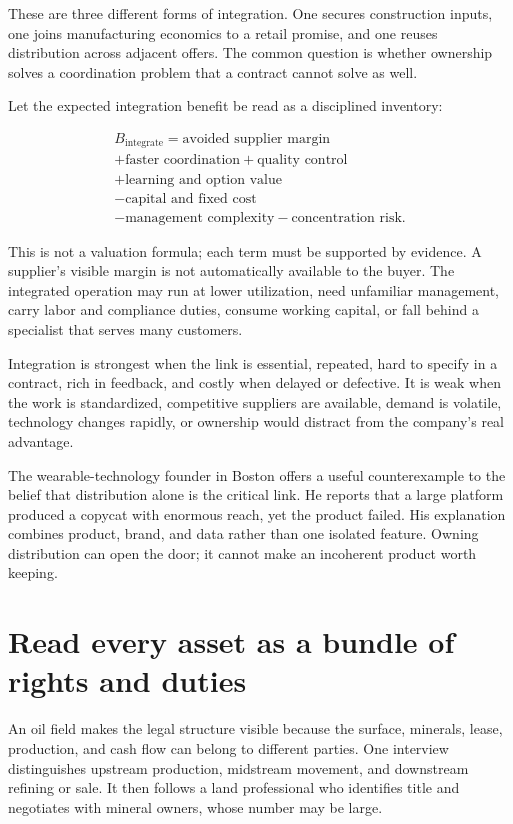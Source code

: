 These are three different forms of integration. One secures construction
inputs, one joins manufacturing economics to a retail promise, and one reuses
distribution across adjacent offers. The common question is whether ownership
solves a coordination problem that a contract cannot solve as well.

Let the expected integration benefit be read as a disciplined inventory:

\begin{equation}
\begin{gathered}
B_{\mathrm{integrate}}=\text{avoided supplier margin}\\
+\text{faster coordination}+\text{quality control}\\
+\text{learning and option value}\\
-\text{capital and fixed cost}\\
-\text{management complexity}-\text{concentration risk}.
\end{gathered}
\end{equation}

This is not a valuation formula; each term must be supported by evidence. A
supplier's visible margin is not automatically available to the buyer. The
integrated operation may run at lower utilization, need unfamiliar management,
carry labor and compliance duties, consume working capital, or fall behind a
specialist that serves many customers.

Integration is strongest when the link is essential, repeated, hard to specify
in a contract, rich in feedback, and costly when delayed or defective. It is
weak when the work is standardized, competitive suppliers are available,
demand is volatile, technology changes rapidly, or ownership would distract
from the company's real advantage.

The wearable-technology founder in Boston offers a useful counterexample to
the belief that distribution alone is the critical link. He reports that a
large platform produced a copycat with enormous reach, yet the product failed.
His explanation combines product, brand, and data rather than one isolated
feature. Owning distribution can open the door; it cannot make an incoherent
product worth keeping.

\section{Read every asset as a bundle of rights and duties}

An oil field makes the legal structure visible because the surface, minerals,
lease, production, and cash flow can belong to different parties. One interview
distinguishes upstream production, midstream movement, and downstream refining
or sale. It then follows a land professional who identifies title and
negotiates with mineral owners, whose number may be large.

